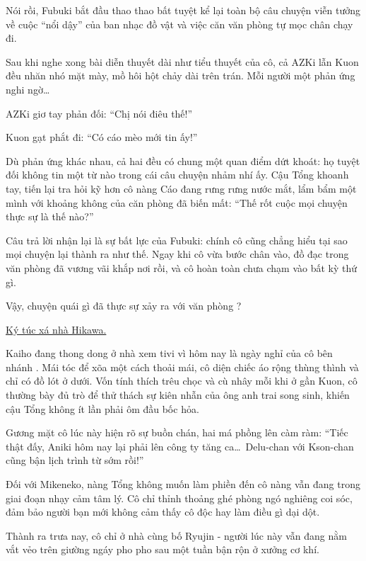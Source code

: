 \documentclass[../main.tex]{subfiles}
\begin{document}

Nói rồi, Fubuki bắt đầu thao thao bất tuyệt kể lại toàn bộ câu chuyện viễn tưởng về cuộc ``nổi dậy'' của ban nhạc đồ vật và việc căn văn phòng tự mọc chân chạy đi.

Sau khi nghe xong bài diễn thuyết dài như tiểu thuyết của cô, cả AZKi lẫn Kuon đều nhăn nhó mặt mày, mồ hôi hột chảy dài trên trán. Mỗi người một phản ứng nghi ngờ\dots

AZKi giơ tay phản đối: ``Chị nói điêu thế!''

Kuon gạt phắt đi: ``Có cáo mèo mới tin ấy!''

Dù phản ứng khác nhau, cả hai đều có chung một quan điểm dứt khoát: họ tuyệt đối không tin một từ nào trong cái câu chuyện nhảm nhí ấy. Cậu Tổng khoanh tay, tiến lại tra hỏi kỹ hơn cô nàng Cáo đang rưng rưng nước mắt, lẩm bẩm một mình với khoảng không của căn phòng đã biến mất: ``Thế rốt cuộc mọi chuyện thực sự là thế nào?''

Câu trả lời nhận lại là sự bất lực của Fubuki: chính cô cũng chẳng hiểu tại sao mọi chuyện lại thành ra như thế. Ngay khi cô vừa bước chân vào, đồ đạc trong văn phòng đã vương vãi khắp nơi rồi, và cô hoàn toàn chưa chạm vào bất kỳ thứ gì.

Vậy, chuyện quái gì đã thực sự xảy ra với văn phòng \hll?

\ct

\begin{center}
  \uline{Ký túc xá nhà Hikawa.}
\end{center}

Kaiho đang thong dong ở nhà xem tivi vì hôm nay là ngày nghỉ của cô bên nhánh \hls. Mái tóc để xõa một cách thoải mái, cô diện chiếc áo rộng thùng thình và chỉ có đồ lót ở dưới. Vốn tính thích trêu chọc và cù nhây mỗi khi ở gần Kuon, cô thường bày đủ trò để thử thách sự kiên nhẫn của ông anh trai song sinh, khiến cậu Tổng không ít lần phải ôm đầu bốc hỏa.

Gương mặt cô lúc này hiện rõ sự buồn chán, hai má phồng lên càm ràm: ``Tiếc thật đấy, Aniki hôm nay lại phải lên công ty tăng ca\dots\ Delu-chan với Kson-chan cũng bận lịch trình từ sớm rồi!''

Đối với Mikeneko, nàng Tổng không muốn làm phiền đến cô nàng vẫn đang trong giai đoạn nhạy cảm tâm lý. Cô chỉ thỉnh thoảng ghé phòng ngó nghiêng coi sóc, đảm bảo người bạn mới không cảm thấy cô độc hay làm điều gì dại dột.

Thành ra trưa nay, cô chỉ ở nhà cùng bố Ryujin - người lúc này vẫn đang nằm vắt vẻo trên giường ngáy pho pho sau một tuần bận rộn ở xưởng cơ khí.
\end{document}

